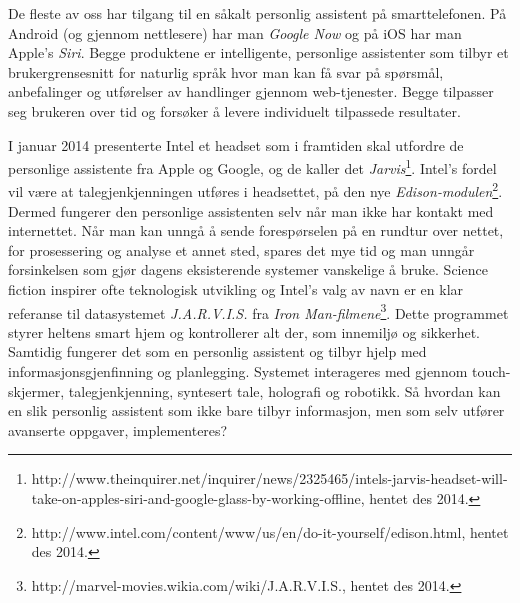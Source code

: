 {De fleste av oss har tilgang til en såkalt personlig assistent på smarttelefonen. På Android (og gjennom nettlesere) har man \emph{Google Now} og på iOS har man Apple's \emph{Siri}. Begge produktene er intelligente, personlige assistenter som tilbyr et brukergrensesnitt for naturlig språk hvor man kan få svar på spørsmål, anbefalinger og utførelser av handlinger gjennom web-tjenester. Begge tilpasser seg brukeren over tid og forsøker å levere individuelt tilpassede resultater.

I januar 2014 presenterte Intel et headset som i framtiden skal utfordre de personlige assistente fra Apple og Google, og de kaller det \emph{Jarvis}\footnote{http://www.theinquirer.net/inquirer/news/2325465/intels-jarvis-headset-will-take-on-apples-siri-and-google-glass-by-working-offline, hentet des 2014.}. Intel's fordel vil være at talegjenkjenningen utføres i headsettet, på den nye \emph{Edison-modulen}\footnote{http://www.intel.com/content/www/us/en/do-it-yourself/edison.html, hentet des 2014.}. Dermed fungerer den personlige assistenten selv når man ikke har kontakt med internettet. Når man kan unngå å sende forespørselen på en rundtur over nettet, for prosessering og analyse et annet sted, spares det mye tid og man unngår forsinkelsen som gjør dagens eksisterende systemer vanskelige å bruke. Science fiction inspirer ofte teknologisk utvikling og Intel's valg av navn er en klar referanse til datasystemet \emph{J.A.R.V.I.S.} fra \emph{Iron Man-filmene}\footnote{http://marvel-movies.wikia.com/wiki/J.A.R.V.I.S., hentet des 2014.}. Dette programmet styrer heltens smart hjem og kontrollerer alt der, som innemiljø og sikkerhet. Samtidig fungerer det som en personlig assistent og tilbyr hjelp med informasjonsgjenfinning og planlegging. Systemet interageres med gjennom touch-skjermer, talegjenkjenning, syntesert tale, holografi og robotikk. Så hvordan kan en slik personlig assistent som ikke bare tilbyr informasjon, men som selv utfører avanserte oppgaver, implementeres?

}
